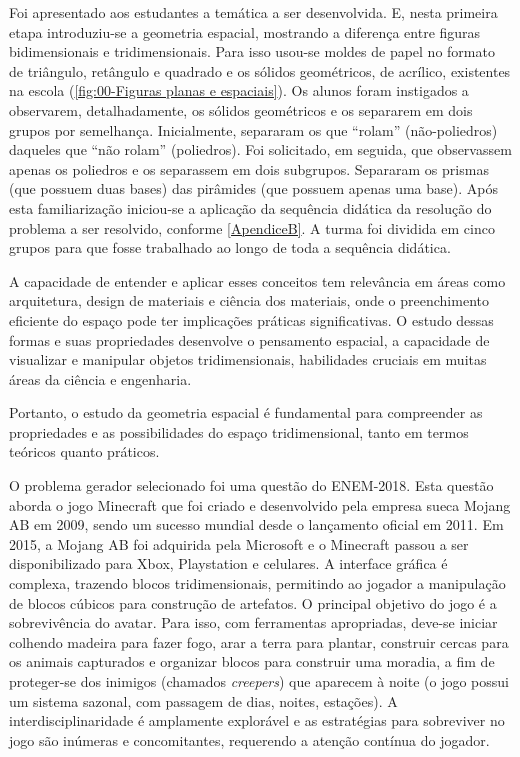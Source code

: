 Foi apresentado aos estudantes a temática a ser desenvolvida. E, nesta primeira etapa introduziu-se a geometria espacial, mostrando a diferença entre figuras bidimensionais e tridimensionais. Para isso usou-se moldes de papel no formato de triângulo, retângulo e quadrado e os sólidos geométricos, de acrílico, existentes na escola (\autoref{fig:00-Figuras planas e espaciais}). Os alunos foram instigados a observarem, detalhadamente, os sólidos geométricos e os separarem em dois grupos por semelhança. Inicialmente, separaram os que ``rolam'' (não-poliedros) daqueles que ``não rolam'' (poliedros). Foi solicitado, em seguida, que observassem apenas os poliedros e os separassem em dois subgrupos. Separaram os prismas (que possuem duas bases) das pirâmides (que possuem apenas uma base). Após esta familiarização iniciou-se a aplicação da sequência didática da resolução do problema a ser resolvido, conforme \autoref{ApendiceB}. A turma foi dividida em cinco grupos para que fosse trabalhado ao longo de toda a sequência didática.

A capacidade de entender e aplicar esses conceitos tem relevância em áreas como arquitetura, design de materiais e ciência dos materiais, onde o preenchimento eficiente do espaço pode ter implicações práticas significativas. O estudo dessas formas e suas propriedades desenvolve o pensamento espacial, a capacidade de visualizar e manipular objetos tridimensionais, habilidades cruciais em muitas áreas da ciência e engenharia.

Portanto, o estudo da geometria espacial é fundamental para compreender as propriedades e as possibilidades do espaço tridimensional, tanto em termos teóricos quanto práticos.

O problema gerador selecionado foi uma questão do ENEM-2018. Esta questão aborda o jogo Minecraft que foi criado e desenvolvido pela empresa sueca Mojang AB em 2009, sendo um sucesso mundial desde o lançamento oficial em 2011. Em 2015, a Mojang AB foi adquirida pela Microsoft e o Minecraft passou a ser disponibilizado para Xbox, Playstation e celulares. A interface gráfica é complexa, trazendo blocos tridimensionais, permitindo ao jogador a manipulação de blocos cúbicos para construção de artefatos. O principal objetivo do jogo é a sobrevivência do avatar. Para isso, com ferramentas apropriadas, deve-se iniciar colhendo madeira para fazer fogo, arar a terra para plantar, construir cercas para os animais capturados e organizar blocos para construir uma moradia, a fim de proteger-se dos inimigos (chamados \textit{creepers}) que aparecem à noite (o jogo possui um sistema sazonal, com passagem de dias, noites, estações). A interdisciplinaridade é amplamente explorável e as estratégias para sobreviver no jogo são inúmeras e concomitantes, requerendo a atenção contínua do jogador.

